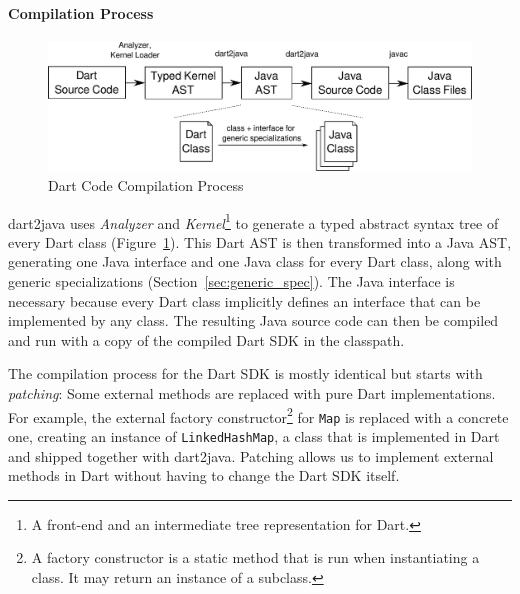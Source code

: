 \documentclass[sigplan,9pt]{acmart}
\begin{document}
\paragraph{Compilation Process}
\begin{figure}[!tp]
    \includegraphics[width=\columnwidth]{dart2java_compile_user_code.pdf}
    \vspace{-10pt}
    \caption{Dart Code Compilation Process}
    \label{fig:user_code_compilation}
\end{figure}
dart2java uses \emph{Analyzer} and \emph{Kernel}\footnote{A front-end and an intermediate tree representation for Dart.} to generate a typed abstract syntax tree of every Dart class (Figure~\ref{fig:user_code_compilation}). This Dart AST is then transformed into a Java AST, generating one Java interface and one Java class for every Dart class, along with generic specializations (Section~\ref{sec:generic_spec}). The Java interface is necessary because every Dart class implicitly defines an interface that can be implemented by any class. The resulting Java source code can then be compiled and run with a copy of the compiled Dart SDK in the classpath.

The compilation process for the Dart SDK is mostly identical but starts with \emph{patching}: Some external methods are replaced with pure Dart implementations. For example, the external factory constructor\footnote{A factory constructor is a static method that is run when instantiating a class. It may return an instance of a subclass.} for \texttt{Map} is replaced with a concrete one, creating an instance of \texttt{LinkedHashMap}, a class that is implemented in Dart and shipped together with dart2java. Patching allows us to implement external methods in Dart without having to change the Dart SDK itself.
\end{document}
